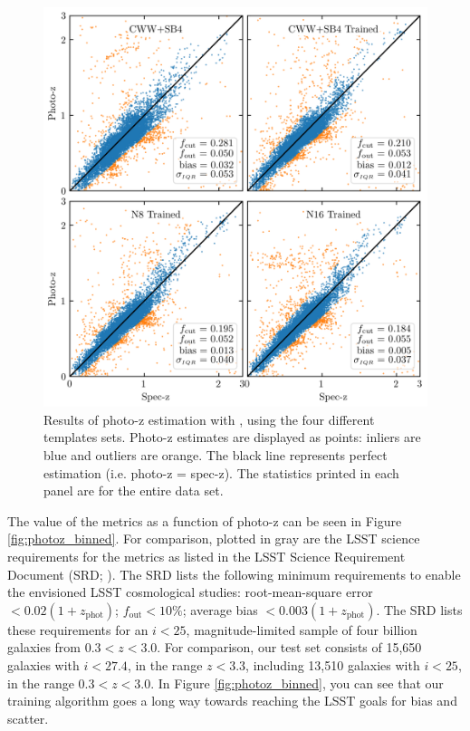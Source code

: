 \begin{figure}
    \centering
    \includegraphics{photoz_results.png}
    \caption{Results of photo-z estimation with \bpz, using the four different templates sets. Photo-z estimates are displayed as points: inliers are blue and outliers are orange. The black line represents perfect estimation (i.e. photo-z = spec-z). The statistics printed in each panel are for the entire data set.}
    \label{fig:photoz_results}
\end{figure}

The value of the metrics as a function of photo-z can be seen in Figure \ref{fig:photoz_binned}. For comparison, plotted in gray are the LSST science requirements for the metrics as listed in the LSST Science Requirement Document (SRD; \citealt{Ivezic2018}).
The SRD lists the following minimum requirements to enable the envisioned LSST cosmological studies: root-mean-square error $< 0.02(1+z_\text{phot})$; $f_\text{out} < 10\%$; average bias $<0.003(1+z_\text{phot})$.
The SRD lists these requirements for an $i<25$, magnitude-limited sample of four billion galaxies from $0.3 < z < 3.0$.
For comparison, our test set consists of 15,650 galaxies with $i < 27.4$, in the range $z < 3.3$, including 13,510 galaxies with $i < 25$, in the range $0.3 < z < 3.0$.
In Figure \ref{fig:photoz_binned}, you can see that our training algorithm goes a long way towards reaching the LSST goals for bias and scatter.

